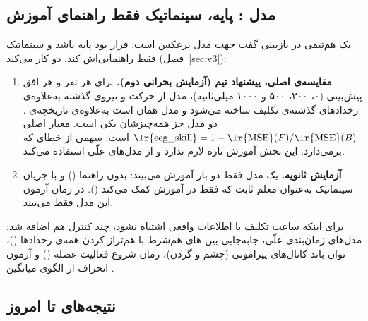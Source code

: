 \subsection{مدل :  پایه، سینماتیک فقط راهنمای آموزش}

یک هم‌تیمی در بازبینی  گفت جهت مدل برعکس است: قرار بود  پایه باشد و سینماتیک فقط راهنمایی‌اش کند.  دو کار می‌کند (فصل~\ref{sec:v3}):

\begin{enumerate}
\item \textbf{مقایسه‌ی اصلی، پیشنهاد تیم (آزمایش بحرانی دوم).} برای هر نفر و هر افق پیش‌بینی (۰، ۲۰۰، ۵۰۰ و ۱۰۰۰ میلی‌ثانیه)، مدل  از حرکت و نیروی گذشته به‌علاوه‌ی رخدادهای گذشته‌ی تکلیف ساخته می‌شود و مدل  همان  است به‌علاوه‌ی تاریخچه‌ی . دو مدل جز  همه‌چیزشان یکی است. معیار اصلی $\text{\lr{eeg\_skill}} = 1 - \text{\lr{MSE}}(F) / \text{\lr{MSE}}(B)$ است: سهمی از خطای  که  برمی‌دارد. این بخش آموزش تازه لازم ندارد و از مدل‌های علّی  استفاده می‌کند.
\item \textbf{آزمایش ثانویه.} یک مدل فقط‌ دو بار آموزش می‌بیند: بدون راهنما () و با جریان سینماتیک  به‌عنوان معلم ثابت که فقط در آموزش کمک می‌کند (). در زمان آزمون این مدل فقط  می‌بیند.
\end{enumerate}

برای اینکه ساعت تکلیف با اطلاعات واقعی  اشتباه نشود، چند کنترل هم اضافه شد: مدل‌های زمان‌بندی علّی، جابه‌جایی  بین های هم‌شرط با هم‌تراز کردن همه‌ی رخدادها ()، توان باند کانال‌های پیرامونی (چشم و گردن)، زمان شروع فعالیت عضله () و آزمون انحراف از الگوی میانگین .

\subsection{نتیجه‌های تا امروز}

